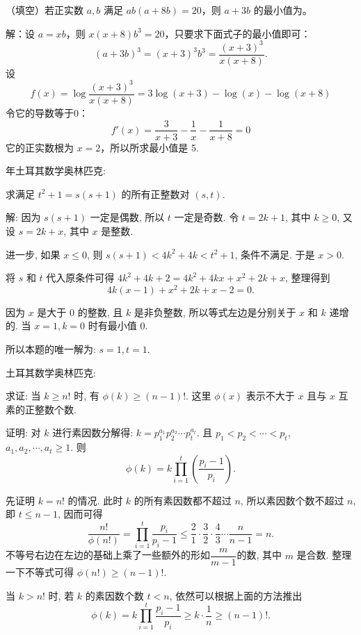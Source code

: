 （填空）若正实数 $ a,b $ 满足 $ ab(a+8b) = 20 $，则 $ a + 3b $ 的最小值为\underline{\hspace{2em}}。

解：设 $ a = xb $，则 $ x(x+8)b^3=20 $，只要求下面式子的最小值即可：
\[ (a+3b)^3 = (x+3)^3b^3 = \frac{(x+3)^3}{x(x+8)} .\]
设 
\[ f(x) = \log \frac{(x+3)^3}{x(x+8)} = 3\log (x+3) - \log(x) - \log(x+8) \]
令它的导数等于0：
\[ f'(x) = \frac{3}{x+3}-\frac{1}{x}- \frac{1}{x+8} = 0\]
它的正实数根为 $ x = 2 $，所以所求最小值是 5.

\newpage


 年土耳其数学奥林匹克: 

求满足 $ t^2+1=s(s+1) $ 的所有正整数对 $ (s,t) $.

解: 因为 $ s(s+1) $ 一定是偶数, 所以 $ t $ 一定是奇数. 令 $ t = 2k + 1 $, 其中 $ k \ge 0 $, 又设 $ s = 2k + x $, 其中 $ x $ 是整数. 

进一步, 如果 $ x \le 0 $, 则 $ s(s+1) < 4k^2+4k < t^2 + 1 $, 条件不满足. 于是 $ x > 0 $.

将 $ s $ 和 $ t $ 代入原条件可得 $ 4k^2 + 4k + 2 = 4k^2 + 4kx + x^2 + 2k + x $, 整理得到 
\[ 4k(x-1)+x^2+2k+x-2=0. \] 

因为 $ x $ 是大于 0 的整数, 且 $ k $ 是非负整数, 所以等式左边是分别关于 $ x $ 和 $ k $ 递增的. 当 $ x = 1, k = 0 $ 时有最小值 0.

所以本题的唯一解为: $ s = 1, t = 1 $.


\newpage

 土耳其数学奥林匹克:

求证: 当 $k \ge n!$ 时, 有 $\phi(k) \ge (n-1)!$. 这里 $\phi(x)$ 表示不大于 $x$ 且与 $x$ 互素的正整数个数.


证明: 对 $k$ 进行素因数分解得: $k = p_1^{a_1}p_2^{a_2}\cdots p_t^{a_t}$. 且 $p_1<p_2<\cdots<p_t$, $a_1, a_2, \cdots, a_t \ge 1$. 则 
\[
\phi(k) = k\prod_{i=1}^t(\frac{p_i-1}{p_i}).
\]

先证明 $k = n!$ 的情况. 此时 $k$ 的所有素因数都不超过 $n$, 所以素因数个数不超过 $n$, 即 $t\le n - 1$, 因而可得
\[\frac{n!}{\phi(n!)} = \prod_{i=1}^t\frac{p_i}{p_i-1} \le \frac{2}{1}\cdot\frac{3}{2}\cdot\frac{4}{3}\cdots\frac{n}{n-1} = n.\]
不等号右边在左边的基础上乘了一些额外的形如$\dfrac{m}{m-1}$的数, 其中 $m$ 是合数. 整理一下不等式可得 $\phi(n!) \ge (n-1)!$.

当 $k > n!$ 时, 若 $k$ 的素因数个数 $t < n$, 依然可以根据上面的方法推出 
\[\phi(k) =  k\prod_{i=1}^t\frac{p_i-1}{p_i} \ge k\cdot\frac{1}{n} \ge (n-1)! .\]

